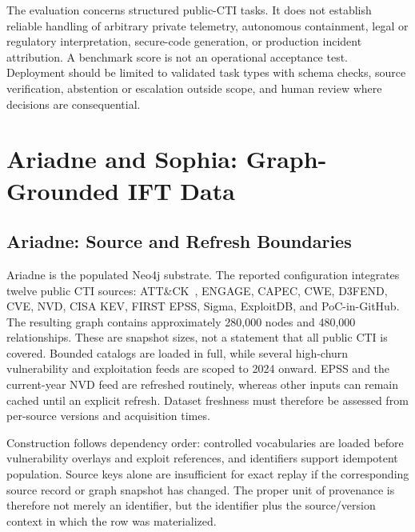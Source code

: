 \documentclass[conference]{IEEEtran}
\begin{document}
The evaluation concerns structured public-CTI tasks. It does not establish reliable handling of arbitrary private telemetry, autonomous containment, legal or regulatory interpretation, secure-code generation, or production incident attribution. A benchmark score is not an operational acceptance test. Deployment should be limited to validated task types with schema checks, source verification, abstention or escalation outside scope, and human review where decisions are consequential.

\section{Ariadne and Sophia: Graph-Grounded IFT Data}
\subsection{Ariadne: Source and Refresh Boundaries}
Ariadne is the populated Neo4j substrate. The reported configuration integrates twelve public CTI sources: ATT\&CK~\cite{strom2018attack}, ENGAGE, CAPEC, CWE, D3FEND, CVE, NVD, CISA KEV, FIRST EPSS, Sigma, ExploitDB, and PoC-in-GitHub. The resulting graph contains approximately 280,000 nodes and 480,000 relationships. These are snapshot sizes, not a statement that all public CTI is covered. Bounded catalogs are loaded in full, while several high-churn vulnerability and exploitation feeds are scoped to 2024 onward. EPSS and the current-year NVD feed are refreshed routinely, whereas other inputs can remain cached until an explicit refresh. Dataset freshness must therefore be assessed from per-source versions and acquisition times.

Construction follows dependency order: controlled vocabularies are loaded before vulnerability overlays and exploit references, and identifiers support idempotent population. Source keys alone are insufficient for exact replay if the corresponding source record or graph snapshot has changed. The proper unit of provenance is therefore not merely an identifier, but the identifier plus the source/version context in which the row was materialized.
\end{document}
